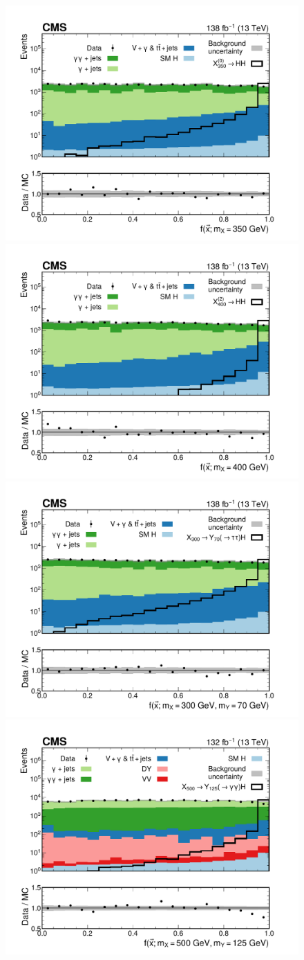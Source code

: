 \begin{figure}
    \centering
    \includegraphics[width=.49\textwidth]{Figures/Dihiggs/categorisation/intermediate_transformed_score_GluGluToRadionToHHTo2G2Tau_M-350_GluGluToRadionToHHTo2G2Tau_M-350_paper.pdf}
    \includegraphics[width=.49\textwidth]{Figures/Dihiggs/categorisation/intermediate_transformed_score_GluGluToBulkGravitonToHHTo2G2Tau_M-400_GluGluToBulkGravitonToHHTo2G2Tau_M-400_paper.pdf}
    \includegraphics[width=.49\textwidth]{Figures/Dihiggs/categorisation/intermediate_transformed_score_NMSSM_XYH_Y_tautau_H_gg_MX_300_MY_70_NMSSM_XYH_Y_tautau_H_gg_MX_300_MY_70_paper.pdf}
    \\
    \includegraphics[width=.49\textwidth]{Figures/Dihiggs/categorisation/intermediate_transformed_score_NMSSM_XYH_Y_gg_H_tautau_MX_500_MY_125_NMSSM_XYH_Y_gg_H_tautau_MX_500_MY_125_paper.pdf}

\end{figure}
